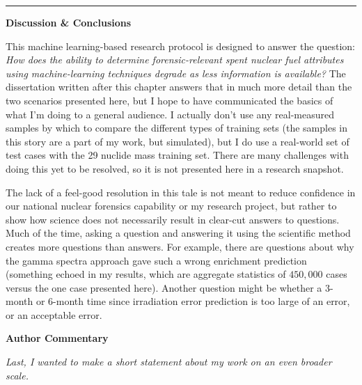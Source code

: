 {\hrule

\begin{tcolorbox}[halign=center]
\textbf{Discussion \& Conclusions}
\end{tcolorbox}

This machine learning-based research protocol is designed to answer the
question: \textit{How does the ability to determine forensic-relevant spent
nuclear fuel attributes using machine-learning techniques degrade as less
information is available?} The dissertation written after this chapter answers
that in much more detail than the two scenarios presented here, but I hope to
have communicated the basics of what I'm doing to a general audience. I
actually don't use any real-measured samples by which to compare the different
types of training sets (the samples in this story are a part of my work, but
simulated), but I do use a real-world set of test cases with the 29 nuclide
mass training set.  There are many challenges with doing this yet to be
resolved, so it is not presented here in a research snapshot.

The lack of a feel-good resolution in this tale is not meant to reduce
confidence in our national nuclear forensics capability or my research project,
but rather to show how science does not necessarily result in clear-cut answers
to questions. Much of the time, asking a question and answering it using the
scientific method creates more questions than answers. For example,  there are
questions about why the gamma spectra approach gave such a wrong enrichment
prediction (something echoed in my results, which are aggregate statistics of
$450,000$ cases versus the one case presented here). Another question might be
whether a 3-month or 6-month time since irradiation error prediction is too
large of an error, or an acceptable error.

\begin{tcolorbox}[halign=center]
\textbf{Author Commentary}
\end{tcolorbox}

\textit{Last, I wanted to make a short statement about my work on an even
broader scale.}

}
